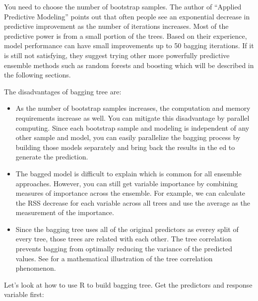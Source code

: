 \documentclass[12pt,]{krantz}
\makeatletter
\newenvironment{Shaded}{\begin{snugshade}}{\end{snugshade}}
\newcommand{\CommentTok}[1]{\textcolor[rgb]{0.37,0.37,0.37}{\textit{#1}}}
\newcommand{\KeywordTok}[1]{\textcolor[rgb]{0.27,0.27,0.27}{\textbf{#1}}}
\newcommand{\NormalTok}[1]{#1}
\newcommand{\OperatorTok}[1]{\textcolor[rgb]{0.43,0.43,0.43}{\textbf{#1}}}
\newcommand{\StringTok}[1]{\textcolor[rgb]{0.5,0.5,0.5}{#1}}
\newenvironment{kframe}{%
\medskip{}
\setlength{\fboxsep}{.8em}
 \def\at@end@of@kframe{}%
 \ifinner\ifhmode%
  \def\at@end@of@kframe{\end{minipage}}%
  \begin{minipage}{\columnwidth}%
 \fi\fi%
 \def\FrameCommand##1{\hskip\@totalleftmargin \hskip-\fboxsep
 \colorbox{shadecolor}{##1}\hskip-\fboxsep
     \hskip-\linewidth \hskip-\@totalleftmargin \hskip\columnwidth}%
 \MakeFramed {\advance\hsize-\width
   \@totalleftmargin\z@ \linewidth\hsize
   \@setminipage}}%
 {\par\unskip\endMakeFramed%
 \at@end@of@kframe}
\renewenvironment{Shaded}{\begin{kframe}}{\end{kframe}}
\makeatother
\begin{document}
You need to choose the number of bootstrap samples. The author of ``Applied Predictive Modeling'' \citep{APM} points out that often people see an exponential decrease in predictive improvement as the number of iterations increases. Most of the predictive power is from a small portion of the trees. Based on their experience, model performance can have small improvements up to 50 bagging iterations. If it is still not satisfying, they suggest trying other more powerfully predictive ensemble methods such as random forests and boosting which will be described in the following sections.

The disadvantages of bagging tree are:

\begin{itemize}
\item
  As the number of bootstrap samples increases, the computation and memory requirements increase as well. You can mitigate this disadvantage by parallel computing. Since each bootstrap sample and modeling is independent of any other sample and model, you can easily parallelize the bagging process by building those models separately and bring back the results in the ed to generate the prediction.
\item
  The bagged model is difficult to explain which is common for all ensemble approaches. However, you can still get variable importance by combining measures of importance across the ensemble. For example, we can calculate the RSS decrease for each variable across all trees and use the average as the measurement of the importance.
\item
  Since the bagging tree uses all of the original predictors as everey split of every tree, those trees are related with each other. The tree correlation prevents bagging from optimally reducing the variance of the predicted values. See \citep{Hastie2008} for a mathematical illustration of the tree correlation phenomenon.
\end{itemize}

Let's look at how to use R to build bagging tree. Get the predictors and response variable first:

\begin{Shaded}
\end{Shaded}
\end{document}
